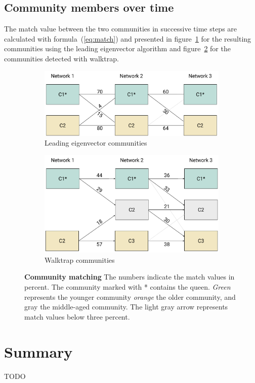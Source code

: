 \subsection{Community members over time}
The match value between the two communities in successive time steps are calculated with formula~(\ref{eq:match}) and presented in figure~\ref{fig:membersLE} for the resulting communities using the leading eigenvector algorithm and figure~\ref{fig:membersWT} for the communities detected with walktrap.

\begin{figure}[htb]
	\centering
	\begin{subfigure}[b]{1.0\textwidth}
	\centering
	\includegraphics[width=.8\textwidth]{Figures/membersLE}
	\caption[Leading eigenvector communities]{Leading eigenvector communities}
	\label{fig:membersLE}
	\vspace*{5mm}
	\end{subfigure} 
	\begin{subfigure}[b]{1.0\textwidth}
	\centering
	\includegraphics[width=.8\textwidth]{Figures/membersWT}
	\caption[Walktrap communities]{Walktrap communities}
	\label{fig:membersWT}
	\vspace*{5mm}
	\end{subfigure}
	\caption[Community matching]{\textbf{Community matching} The numbers indicate the match values in percent. The community marked with * contains the queen. \emph{Green} represents the younger community \emph{orange} the older community, and gray the middle-aged community. The light gray arrow represents match values below three percent.}
	\label{fig:members}
\end{figure}

\section{Summary}
TODO